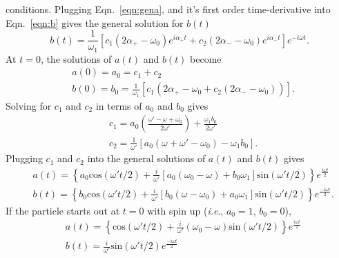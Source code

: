 conditions.  Plugging Eqn.~\ref{eqn:gena}, and it's first order
time-derivative into Eqn.~\ref{eqn:b} gives the general solution for
$b(t)$
%
\begin{equation}
b(t) = \frac{1}{\omega_{1}}[c_{1}(2\alpha_{+}-\omega_{0})e^{i\alpha_{+}t} + c_{2}(2\alpha_{-}-\omega_{0})e^{i\alpha_{-}t}]e^{-i\omega t}.
\end{equation}
%
At $t=0$, the solutions of $a(t)$ and $b(t)$ become
%
\begin{equation}
\begin{split}
& a(0)= a_{0} = c_{1} + c_{2} \\
& b(0) = b_{0} = \frac{1}{\omega_{1}}[c_{1}(2\alpha_{+}-\omega_{0}+ c_{2}(2\alpha_{-}-\omega_{0}))].
\end{split}
\end{equation}
%
Solving for $c_{1}$ and $c_{2}$ in terms of $a_{0}$ and $b_{0}$ gives
%
\begin{equation}
\begin{split}
&c_{1} = a_{0}(\frac{\omega' - \omega + \omega_{0}}{2\omega'}) + \frac{\omega_{1}b_{0}}{2\omega'} \\
&c_{2} = \frac{1}{\omega'}[a_{0}(\omega+\omega'-\omega_{0})-\omega_{1}b_{0}].
\end{split}
\end{equation}
%
Plugging $c_{1}$ and $c_{2}$ into the general solutions of $a(t)$ and
$b(t)$ gives
%
\begin{equation}
\begin{split}
&a(t) = \left\lbrace a_{0} \textrm{cos}(\omega' t/2) + \frac{i}{\omega'}[a_{0}(\omega_{0}-\omega) + b_{0}\omega_{1}] \textrm{sin}(\omega' t/2)
\right\rbrace e^{\frac{i\omega t}{2}} \\
&b(t) = \left\lbrace b_{0} \textrm{cos}(\omega' t/2) + \frac{i}{\omega'}[b_{0}(\omega-\omega_{0}) + a_{0}\omega_{1}]\textrm{sin}(\omega' t/2) \right\rbrace e^{\frac{-i\omega t}{2}}.
\end{split}
\end{equation}
%
If the particle starts out at $t=0$ with spin up ({\it i.e}., $a_{0} =1$,
$b_{0} = 0$),
%
\begin{equation}
\begin{split}
&a(t) =  \left\lbrace \textrm{cos}(\omega' t/2) + \frac{i}{\omega'}(\omega_{0}-\omega)\textrm{sin}(\omega' t/2)
\right\rbrace e^{\frac{i\omega t}{2}} \\
&b(t) = \frac{i}{\omega'}\textrm{sin}(\omega' t/2) e^{\frac{-i\omega t}{2}}
\end{split}
\end{equation}
